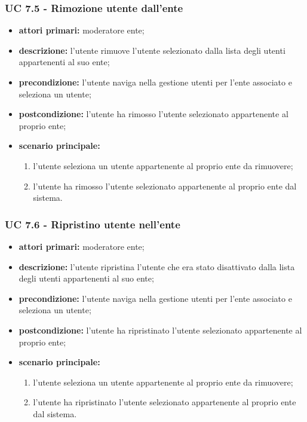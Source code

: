 			\subsubsection{UC 7.5 - Rimozione utente dall'ente}
			\begin{itemize}
				\item \textbf{attori primari:} moderatore ente;
				\item \textbf{descrizione:} l'utente rimuove l'utente selezionato dalla lista degli utenti appartenenti al suo ente;
				\item \textbf{precondizione:} l'utente naviga nella gestione utenti per l'ente associato e seleziona un utente;
				\item \textbf{postcondizione:} l'utente ha rimosso l'utente selezionato appartenente al proprio ente;
				\item \textbf{scenario principale:}
				\begin{enumerate}
					\item{l'utente seleziona un utente appartenente al proprio ente da rimuovere;}
					\item{l'utente ha rimosso l'utente selezionato appartenente al proprio ente dal sistema.}
				\end{enumerate}
			\end{itemize}


			\subsubsection{UC 7.6 - Ripristino utente nell'ente}
			\begin{itemize}
				\item \textbf{attori primari:} moderatore ente;
				\item \textbf{descrizione:} l'utente ripristina l'utente che era stato disattivato dalla lista degli utenti appartenenti al suo ente;
				\item \textbf{precondizione:} l'utente naviga nella gestione utenti per l'ente associato e seleziona un utente;
				\item \textbf{postcondizione:} l'utente ha ripristinato l'utente selezionato appartenente al proprio ente;
				\item \textbf{scenario principale:}
				\begin{enumerate}
					\item{l'utente seleziona un utente appartenente al proprio ente da rimuovere;}
					\item{l'utente ha ripristinato l'utente selezionato appartenente al proprio ente dal sistema.}
				\end{enumerate}
			\end{itemize}
